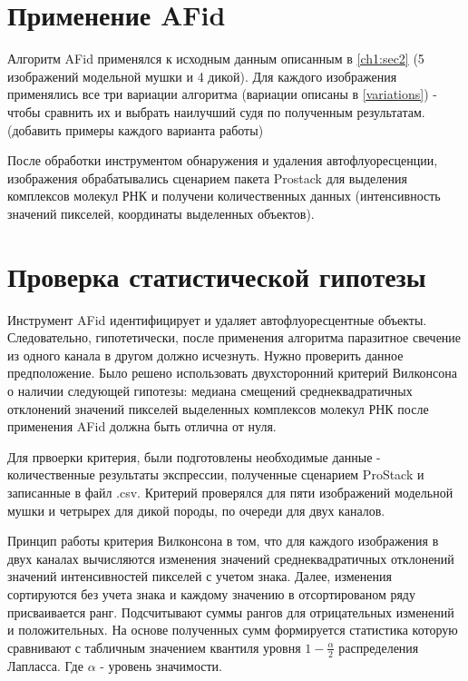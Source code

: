 \section{Применение AFid}

Алгоритм AFid применялся к исходным данным описанным в \ref{ch1:sec2} (5 изображений модельной мушки и 4 дикой). Для каждого изображения применялись все три вариации алгоритма (вариации описаны в \ref{variations}) - чтобы сравнить их и выбрать наилучший судя по полученным результатам.
(добавить примеры каждого варианта работы)

После обработки инструментом обнаружения и удаления автофлуоресценции, изображения обрабатывались сценарием пакета Prostack для выделения комплексов молекул РНК и получени количественных данных (интенсивность значений пикселей, координаты выделенных объектов).


\section{Проверка статистической гипотезы}
Инструмент AFid идентифицирует и удаляет автофлуоресцентные объекты. Следовательно, гипотетически, после применения алгоритма паразитное свечение из одного канала в другом должно исчезнуть. Нужно проверить данное предположение. Было решено использовать двухсторонний критерий Вилконсона о наличии следующей гипотезы: медиана смещений среднеквадратичных отклонений значений пикселей выделенных комплексов молекул РНК после применения AFid должна быть отлична от нуля.

Для првоерки критерия, были подготовлены необходимые данные - количественные результаты экспрессии, полученные сценарием ProStack и записанные в файл .csv. Критерий проверялся для пяти изображений модельной мушки и четрырех для дикой породы, по очереди для двух каналов.

Принцип работы критерия Вилконсона в том, что для каждого изображения в двух каналах вычисляются изменения значений среднеквадратичных отклонений значений интенсивностей пикселей с учетом знака. Далее, изменения сортируются без учета знака и каждому значению в отсортированом ряду присваивается
ранг. Подсчитывают суммы рангов для отрицательных изменений и положительных. На основе полученных сумм формируется статистика которую сравнивают с табличным значением квантиля уровня $1 - \frac{\alpha}{2}$ распределения Лапласса. Где $\alpha$ - уровень значимости.

